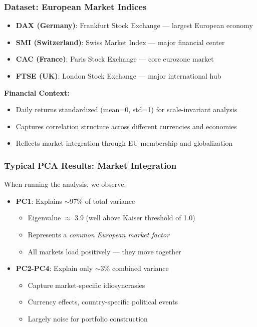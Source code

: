 \documentclass[aspectratio=169]{beamer}
\begin{document}
\begin{frame}
    \frametitle{Dataset: European Market Indices}
    \begin{itemize}
        \item \textbf{DAX (Germany)}: Frankfurt Stock Exchange — largest European economy \pause
        \item \textbf{SMI (Switzerland)}: Swiss Market Index — major financial center \pause
        \item \textbf{CAC (France)}: Paris Stock Exchange — core eurozone market \pause
        \item \textbf{FTSE (UK)}: London Stock Exchange — major international hub \pause
    \end{itemize}
    \vspace{12pt}
    \textbf{Financial Context:}
    \begin{itemize}
        \item Daily returns standardized (mean=0, std=1) for scale-invariant analysis \pause
        \item Captures correlation structure across different currencies and economies \pause
        \item Reflects market integration through EU membership and globalization \pause
    \end{itemize}
\end{frame}

\begin{frame}
    \frametitle{Typical PCA Results: Market Integration}
    When running the analysis, we observe:
    \begin{itemize}
        \item \textbf{PC1}: Explains $\sim$97\% of total variance \pause
              \begin{itemize}
                  \item Eigenvalue $\approx$ 3.9 (well above Kaiser threshold of 1.0) \pause
                  \item Represents a \textit{common European market factor} \pause
                  \item All markets load positively — they move together \pause
              \end{itemize}
        \item \textbf{PC2-PC4}: Explain only $\sim$3\% combined variance \pause
              \begin{itemize}
                  \item Capture market-specific idiosyncrasies \pause
                  \item Currency effects, country-specific political events \pause
                  \item Largely noise for portfolio construction \pause
              \end{itemize}
    \end{itemize}
\end{frame}
\end{document}
